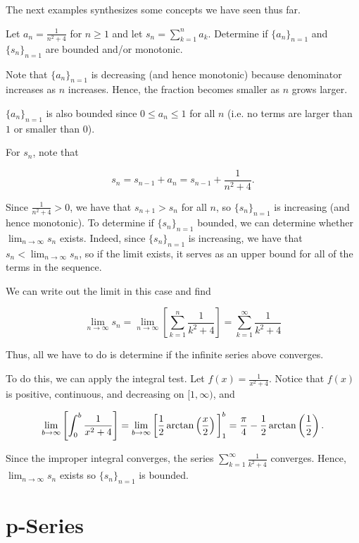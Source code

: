 \documentclass{ximera}
\begin{document}
The next examples synthesizes some concepts we have seen thus far.
\begin{example}
Let $a_n = \frac{1}{n^2+4}$ for $n \geq 1$ and let $s_n = \sum_{k=1}^n a_k$.  Determine if $\{a_n\}_{n=1}$ and $\{s_n\}_{n=1}$ are bounded and/or monotonic.

\begin{explanation}
Note that $\{a_n\}_{n=1}$ is decreasing (and hence monotonic) because denominator increases as $n$ increases.  Hence, the fraction becomes smaller as $n$ grows larger.

$\{a_n\}_{n=1}$ is also bounded since $0 \leq a_n \leq 1$ for all $n$ (i.e. no terms are larger than $1$ or smaller than $0$).

For $s_n$, note that

\[
s_n = s_{n-1} +a_n = s_{n-1} + \frac{1}{n^2+4}.
\]

Since $ \frac{1}{n^2+4} >0$, we have that $s_{n+1} > s_n$ for all $n$, so $\{s_n\}_{n=1}$ is increasing (and hence monotonic).  To determine if $\{s_n\}_{n=1}$ bounded, we can determine whether $\lim_{n \to \infty} s_n$ exists.  Indeed, since $\{s_n\}_{n=1}$ is increasing, we have that $s_n < \lim_{n \to \infty} s_n$, so if the limit exists, it serves as an upper bound for all of the terms in the sequence.

We can write out the limit in this case and find

\[
\lim_{n \to \infty} s_n = \lim_{n \to \infty} \left[ \sum_{k=1}^n \frac{1}{k^2+4} \right] =  \sum_{k=1}^{\infty} \frac{1}{k^2+4}
\]
\end{explanation}

Thus, all we have to do is determine if the infinite series above converges.

To do this, we can apply the integral test.  Let $f(x)= \frac{1}{x^2+4}$.  Notice that $f(x)$ is positive, continuous, and decreasing on $[1,\infty)$, and

\[
\lim_{b \to \infty} \left[ \int_0^b \frac{1}{x^2+4} \right]= \lim_{b \to \infty} \bigg[ \frac{1}{2} \arctan\left(\frac{x}{2}\right) \bigg]_1^b =\frac{\pi}{4}- \frac{1}{2}\arctan\left(\frac{1}{2}\right).
\]

Since the improper integral converges, the series $\sum_{k=1}^{\infty} \frac{1}{k^2+4}$ converges.  Hence, $\lim_{n \to \infty}s_n$ exists so $\{s_n\}_{n=1}$ is bounded.


\end{example}
\section{p-Series}
\end{document}
